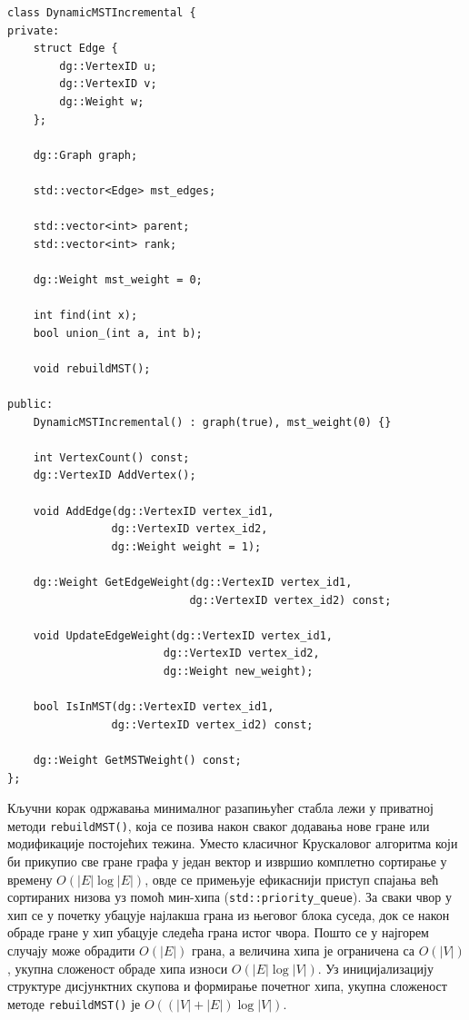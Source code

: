 \begin{lstlisting}[style=thesiscpp, caption={Интерфејс класе \texttt{DynamicMSTIncremental}}, label={lst:mst_interface}]
class DynamicMSTIncremental {
private:
    struct Edge {
        dg::VertexID u;
        dg::VertexID v;
        dg::Weight w;
    };

    dg::Graph graph;

    std::vector<Edge> mst_edges;

    std::vector<int> parent;
    std::vector<int> rank;

    dg::Weight mst_weight = 0;

    int find(int x);
    bool union_(int a, int b);

    void rebuildMST();

public:
    DynamicMSTIncremental() : graph(true), mst_weight(0) {}

    int VertexCount() const;
    dg::VertexID AddVertex();

    void AddEdge(dg::VertexID vertex_id1,
                dg::VertexID vertex_id2,
                dg::Weight weight = 1);

    dg::Weight GetEdgeWeight(dg::VertexID vertex_id1,
                            dg::VertexID vertex_id2) const;

    void UpdateEdgeWeight(dg::VertexID vertex_id1,
                        dg::VertexID vertex_id2,
                        dg::Weight new_weight);

    bool IsInMST(dg::VertexID vertex_id1,
                dg::VertexID vertex_id2) const;

    dg::Weight GetMSTWeight() const;
};

\end{lstlisting}

Кључни корак одржавања минималног разапињућег стабла лежи у приватној методи \texttt{rebuildMST()}, која се позива након сваког додавања нове гране или модификације постојећих тежина. Уместо класичног Крускаловог алгоритма који би прикупио све гране графа у један вектор и извршио комплетно сортирање у времену $O(|E| \log |E|)$, овде се примењује ефикаснији приступ спајања већ сортираних низова уз помоћ мин-хипа (\texttt{std::priority\_queue}). За сваки чвор у хип се у почетку убацује најлакша грана из његовог блока суседа, док се након обраде гране у хип убацује следећа грана истог чвора. Пошто се у најгорем случају може обрадити $O(|E|)$ грана, а величина хипа је ограничена са $O(|V|)$, укупна сложеност обраде хипа износи $O(|E|\log |V|)$. Уз иницијализацију структуре дисјунктних скупова и формирање почетног хипа, укупна сложеност методе \texttt{rebuildMST()} је $O((|V|+|E|)\log |V|)$.

